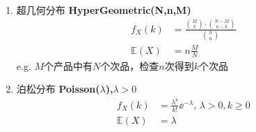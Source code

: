 \begin{enumerate}
		\[\begin{aligned}
		\E{X}&=\sum_{k=0}^\infty\binom{k+r-1}{r-1}p^r(1-p)^k\\
		&=\sum_{k=0}^\infty r\lrp{\binom{k+r}{r}-\binom{k+r-1}{r-1}}p^r(1-p)^k\qquad k\binom{n}{k}=n\binom{n-1}{k-1}\mbox{的变形}\\
		&=rp^r\lrp{\sum_{k=0}^\infty\binom{k+r}{r}(1-p)^k-\sum_{k=0}^\infty\binom{k+r-1}{r-1}(1-p)^k}\\
		&=rp^r\lrp{\sum_{k=0}^\infty\binom{\textcolor{red}{k+r}}{k}(1-p)^k-\sum_{k=0}^\infty\binom{k+r-1}{k}(1-p)^k}\\
		&=rp^r\lrp{\sum_{k=0}^\infty(-1)^k\binom{\textcolor{red}{-r-1}}{k}(1-p)^k-\sum_{k=0}^\infty(-1)^k\binom{-r}{k}(1-p)^k}\\
		&\quad\mbox{这步是关键，将变化的$(k+r)$转成$(-r-1)$，使得可以正常使用二项式定理}\\
		&=rp^r\lrp{\sum_{k=0}^\infty\binom{-r-1}{k}1^{-r-1-k}(p-1)^k-\sum_{k=0}^\infty\binom{-r}{k}1^{-r-k}(p-1)^k}\\
		&=rp^r\lrp{(1+(p-1))^{-r-1}-(1+(p-1))^{-r}}\qquad\mbox{牛顿二项式}\\
		&=r(p^{-1}-1)\\
		&=r\frac{1-p}{p}
		\end{aligned}\]
		补充证明：
		\[\begin{aligned}
		\binom{k+r}{k}&=\frac{(k+r)(k+r-1)\cdots(r+1)}{k(k-1)\cdots 1}\\
		&=(-1)^k\frac{(-k-r)(-k-r-1)\cdots(-r-1)}{k(k-1)\cdots 1}\\
		&=(-1)^k\frac{(-r-1)(-r-2)\cdots(-r-1-k+1)}{k(k-1)\cdots 1}\qquad\mbox{把分子各项逆过来}\\
		&=(-1)^k\binom{-r-1}{k}
		\end{aligned}\]
		e.g. 扔$k$次反面直到有$r$个正面（做实验直到你获得$r$次成功，记录失败次数）
	\item 超几何分布 \textbf{HyperGeometric(N,n,M)}
		\[\begin{aligned}
		f_{X}(k)& =\frac{\binom{M}{k}\cdot \binom{N-M}{n-k}}{\binom{N}{n}}\\
		\mathbb{E}(X)& =n\frac{M}{N}
		\end{aligned}\]
		e.g. $M$个产品中有$N$个次品，检查$n$次得到$k$个次品
	\item 泊松分布 \textbf{Poisson($\lambda$),$\lambda>0$}
		\[\begin{aligned}
		f_{X}(k)& =\frac{\lambda^k}{k!}\ee^{-\lambda},\,\lambda>0,k\geq0\\
		\mathbb{E}(X)& =\lambda
		\end{aligned}\]

\end{enumerate}
